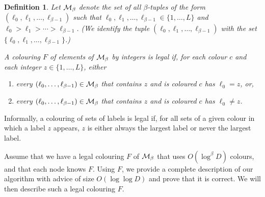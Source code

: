 \documentclass[11pt]{article}
\newtheorem{definition}{Definition}[section]
\newcommand{\maxcandidates}{\ensuremath{\beta}}
\begin{document}
\begin{definition}
Let ${\cal M}_{\maxcandidates}$ denote the set of all $\maxcandidates$-tuples of the form $(\ell_0,\ell_1,\ldots,\ell_{\maxcandidates-1})$ such that $\ell_0,\ell_1,\ldots,\ell_{\maxcandidates-1} \in \{1,\ldots,L\}$ and $\ell_0 > \ell_1 > \cdots > \ell_{\maxcandidates-1}$. (We identify the tuple $(\ell_0,\ell_1,\ldots,\ell_{\maxcandidates-1})$
with the set $\{\ell_0,\ell_1,\ldots,\ell_{\maxcandidates-1}\}$.)

A colouring $F$ of elements of ${\cal M}_{\maxcandidates}$ by integers is \emph{legal} if, for each colour $c$ and each integer $z \in \{1,\ldots,L\}$, either
\begin{enumerate}
\item every $(\ell_0,\ldots,\ell_{\maxcandidates-1}) \in {\cal M}_{\maxcandidates}$ that contains $z$ and is coloured $c$ has $\ell_0 = z$, or,
\item every $(\ell_0,\ldots,\ell_{\maxcandidates-1}) \in {\cal M}_{\maxcandidates}$ that contains $z$ and is coloured $c$ has $\ell_0 \neq z$.
\end{enumerate}
\end{definition}

Informally, a colouring of sets of labels is legal if,  for all sets of a given colour in which a label $z$ appears,
$z$ is either always the largest label or never the largest label. 

Assume that we have a legal colouring $F$ of ${\cal M}_{\maxcandidates}$ that uses $O(\log^{\maxcandidates} D)$ colours, and that each node knows $F$. Using $F$, we provide a complete description of our algorithm with advice of size $O(\log\log D)$ and prove that it is correct. We will then describe such a legal colouring $F$. 
\end{document}
